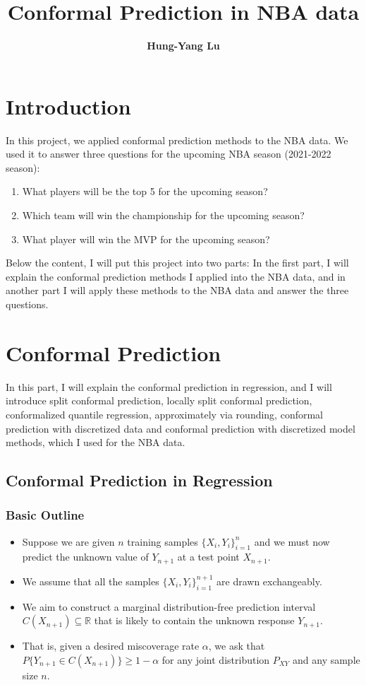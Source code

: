 \documentclass[11pt,a4paper]{article}
\title{\textbf{Conformal Prediction in NBA data}}
\author{\textbf{Hung-Yang Lu}}
\date{}
\begin{document}
\maketitle

\section{Introduction}
In this project, we applied conformal prediction methods to the NBA data. We used it to answer three questions for the upcoming NBA season (2021-2022 season):
\begin{enumerate}
    \item What players will be the top 5 for the upcoming season?
    \item Which team will win the championship for the upcoming season?
    \item What player will win the MVP for the upcoming season?
\end{enumerate}

Below the content, I will put this project into two parts: In the first part, I will explain the conformal prediction methods I applied into the NBA data, and in another part I will apply these methods to the NBA data and answer the three questions.

\section{Conformal Prediction}
In this part, I will explain the conformal prediction in regression, and I will introduce split conformal prediction, locally split conformal prediction, conformalized quantile regression, approximately via rounding, conformal prediction with discretized data and conformal prediction with discretized model methods, which I used for the NBA data.

\subsection{Conformal Prediction in Regression}
\subsubsection{Basic Outline}
\begin{itemize}
    \item Suppose we are given $n$ training samples $\{X_i, Y_i\}_{i=1}^n$ and we must now predict the unknown value of $Y_{n+1}$ at a test point $X_{n+1}$.
    \item We assume that all the samples $\{X_i, Y_i\}_{i=1}^{n+1}$ are drawn exchangeably.
    \item We aim to construct a marginal distribution-free prediction interval $C(X_{n+1}) \subseteq \mathbb{R}$ that is likely to contain the unknown response $Y_{n+1}$.
    \item That is, given a desired miscoverage rate $\alpha$, we ask that $P\{Y_{n+1} \in C(X_{n+1})\} \ge 1 - \alpha$ for any joint distribution $P_{XY}$ and any sample size $n$.
\end{itemize}
\end{document}
